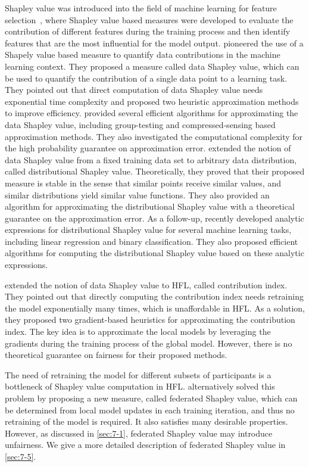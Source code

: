 Shapley value was introduced into the field of machine learning for feature selection~\citep{cohen2005feature, lundberg2017unified,strumbelj2010efficient}, where Shapley value based measures were developed to evaluate the contribution of different features during the training process and then identify features that are the most influential for the model output. \citet{ghorbani2019data} pioneered the use of a Shapely value based measure to quantify data contributions in the machine learning context. They proposed a measure called data Shapley value, which can be used to quantify the contribution of a single data point to a learning task. They pointed out that direct computation of data Shapley value needs exponential time complexity and proposed two heuristic approximation methods to improve efficiency. \citet{jia2019towards} provided several efficient algorithms for approximating the data Shapley value, including group-testing and compressed-sensing based approximation methods. They also investigated the computational complexity for the high probability guarantee on approximation error. \citet{ghorbani2020distributional} extended the notion of data Shapley value from a fixed training data set to arbitrary data distribution, called distributional Shapley value. Theoretically, they proved that their proposed measure is stable in the sense that similar points receive similar values, and similar distributions yield similar value functions. They also provided an algorithm for approximating the distributional Shapley value with a theoretical guarantee on the approximation error. As a follow-up,  \citet{kwon2021efficient} recently developed analytic expressions for distributional Shapley value for several machine learning tasks, including linear regression and binary classification. They also proposed efficient algorithms for computing the distributional Shapley value based on these analytic expressions. 

\citet{song2019profit} extended the notion of data Shapley value to HFL, called contribution index. They pointed out that directly computing the contribution index needs retraining the model exponentially many times, which is unaffordable in HFL. As a solution, they proposed two gradient-based heuristics for approximating the contribution index. The key idea is to approximate the local models by leveraging the gradients during the training process of the global model. However, there is no theoretical guarantee on fairness for their proposed methods. 

The need of retraining the model for different subsets of participants is a bottleneck of Shapley value computation in HFL. \citet{wang2020principled} alternatively solved this problem by proposing a new measure, called federated Shapley value, which can be determined from local model updates in each training iteration, and thus no retraining of the model is required. It also satisfies many desirable properties. However, as discussed in \autoref{sec:7-1}, federated Shapley value may introduce unfairness. We give a more detailed description of federated Shapley value in \autoref{sec:7-5}. 

